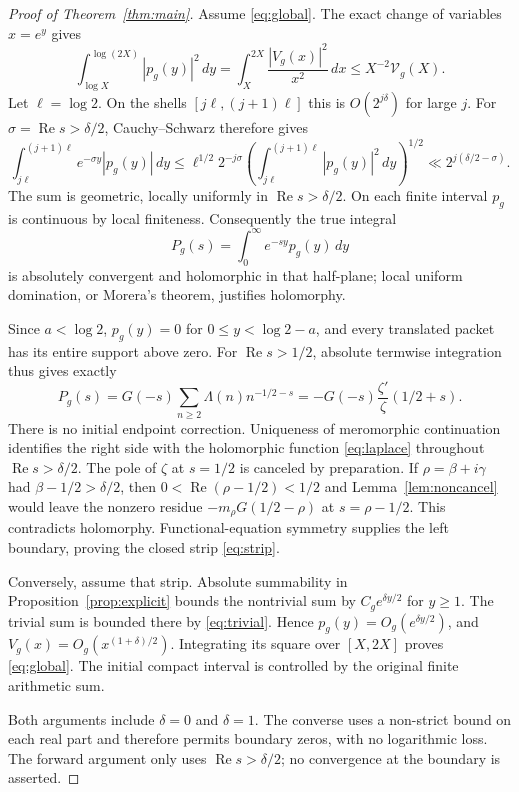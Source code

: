 \documentclass[11pt]{article}
\theoremstyle{remark}
\newcommand{\dd}{\,d}
\newcommand{\Vcal}{\mathcal V_g}
\newcommand{\Rea}{\operatorname{Re}}
\numberwithin{equation}{section}
\begin{document}
\begin{proof}[Proof of Theorem~\ref{thm:main}]
Assume \eqref{eq:global}. The exact change of variables $x=e^y$ gives
\begin{equation}\label{eq:shell}
\int_{\log X}^{\log(2X)}|p_g(y)|^2\dd y
=\int_X^{2X}\frac{|V_g(x)|^2}{x^2}\dd x
\le X^{-2}\Vcal(X).
\end{equation}
Let $\ell=\log2$. On the shells $[j\ell,(j+1)\ell]$ this is
$O(2^{j\delta})$ for large $j$. For $\sigma=\Rea s>\delta/2$,
Cauchy--Schwarz therefore gives
\[
\int_{j\ell}^{(j+1)\ell}e^{-\sigma y}|p_g(y)|\dd y
\le \ell^{1/2}2^{-j\sigma}
\left(\int_{j\ell}^{(j+1)\ell}|p_g(y)|^2\dd y\right)^{1/2}
\ll 2^{j(\delta/2-\sigma)}.
\]
The sum is geometric, locally uniformly in $\Rea s>\delta/2$.
On each finite interval $p_g$ is continuous by local finiteness.
Consequently the true integral
\begin{equation}\label{eq:laplace}
P_g(s)=\int_0^\infty e^{-sy}p_g(y)\dd y
\end{equation}
is absolutely convergent and holomorphic in that half-plane; local
uniform domination, or Morera's theorem, justifies holomorphy.

Since $a<\log2$, $p_g(y)=0$ for $0\le y<\log2-a$, and every translated
packet has its entire support above zero. For $\Rea s>1/2$,
absolute termwise integration thus gives exactly
\begin{equation}\label{eq:laplace-zeta}
P_g(s)=G(-s)\sum_{n\ge2}\Lambda(n)n^{-1/2-s}
=-G(-s)\frac{\zeta'}{\zeta}(1/2+s).
\end{equation}
There is no initial endpoint correction. Uniqueness of meromorphic
continuation identifies the right side with the holomorphic function
\eqref{eq:laplace} throughout $\Rea s>\delta/2$.
The pole of $\zeta$ at $s=1/2$ is canceled by preparation.
If $\rho=\beta+i\gamma$ had $\beta-1/2>\delta/2$, then
$0<\Rea(\rho-1/2)<1/2$ and Lemma~\ref{lem:noncancel} would leave the
nonzero residue $-m_\rho G(1/2-\rho)$ at $s=\rho-1/2$.
This contradicts holomorphy. Functional-equation symmetry supplies the
left boundary, proving the closed strip \eqref{eq:strip}.

Conversely, assume that strip. Absolute summability in
Proposition~\ref{prop:explicit} bounds the nontrivial sum by
$C_g e^{\delta y/2}$ for $y\ge1$. The trivial sum is bounded there
by \eqref{eq:trivial}. Hence
$p_g(y)=O_g(e^{\delta y/2})$, and
$V_g(x)=O_g(x^{(1+\delta)/2})$. Integrating its square over $[X,2X]$
proves \eqref{eq:global}. The initial compact interval is controlled
by the original finite arithmetic sum.

Both arguments include $\delta=0$ and $\delta=1$. The converse uses
a non-strict bound on each real part and therefore permits boundary
zeros, with no logarithmic loss. The forward argument only uses
$\Rea s>\delta/2$; no convergence at the boundary is asserted.
\end{proof}
\end{document}
